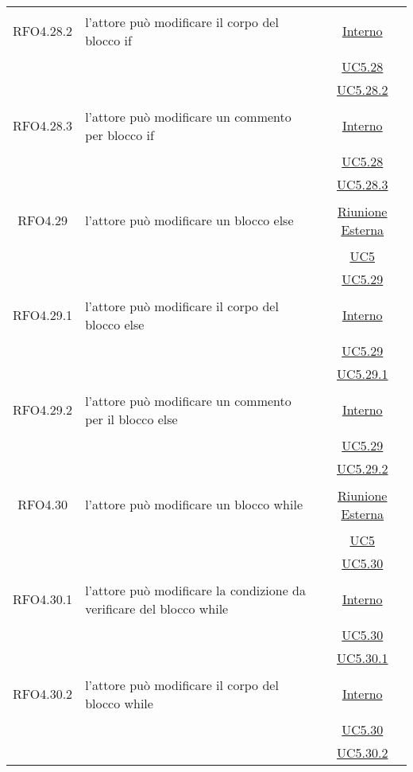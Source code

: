 \begin{longtable}{|c|>{\centering}m{7cm}|c|}
\hypertarget{RFO4.28.2}{RFO4.28.2} & l'attore può modificare il corpo del blocco if & \hyperlink{Interno}{Interno}\\
& &\hyperref[UC5.28]{UC5.28}\\
& &\hyperref[UC5.28.2]{UC5.28.2}\\ \hline

\hypertarget{RFO4.28.3}{RFO4.28.3} & l'attore può modificare un commento per blocco if & \hyperlink{Interno}{Interno}\\
& &\hyperref[UC5.28]{UC5.28}\\
& &\hyperref[UC5.28.3]{UC5.28.3}\\ \hline

\hypertarget{RFO4.29}{RFO4.29} & l'attore può modificare un blocco else & \hyperlink{Riunione Esterna}{Riunione Esterna}\\
& &\hyperref[UC5]{UC5}\\
& &\hyperref[UC5.29]{UC5.29}\\ \hline

\hypertarget{RFO4.29.1}{RFO4.29.1} & l'attore può modificare il corpo del blocco else &\hyperlink{Interno}{Interno}\\
& &\hyperref[UC5.29]{UC5.29}\\
& &\hyperref[UC5.29.1]{UC5.29.1}\\ \hline

\hypertarget{RFO4.29.2}{RFO4.29.2} & l'attore può modificare un commento per il blocco else & \hyperlink{Interno}{Interno}\\
& &\hyperref[UC5.29]{UC5.29}\\
& &\hyperref[UC5.29.2]{UC5.29.2}\\ \hline

\hypertarget{RFO4.30}{RFO4.30} & l'attore può modificare un blocco while & \hyperlink{Riunione Esterna}{Riunione Esterna}\\
& &\hyperref[UC5]{UC5}\\
& &\hyperref[UC5.30]{UC5.30}\\ \hline

\hypertarget{RFO4.30.1}{RFO4.30.1} & l'attore può modificare la condizione da verificare del blocco while & \hyperlink{Interno}{Interno}\\
& &\hyperref[UC5.30]{UC5.30}\\
& &\hyperref[UC5.30.1]{UC5.30.1}\\ \hline

\hypertarget{RFO4.30.2}{RFO4.30.2} & l'attore può modificare il corpo del blocco while & \hyperlink{Interno}{Interno}\\
& &\hyperref[UC5.30]{UC5.30}\\
& &\hyperref[UC5.30.2]{UC5.30.2}\\ \hline


\end{longtable}
